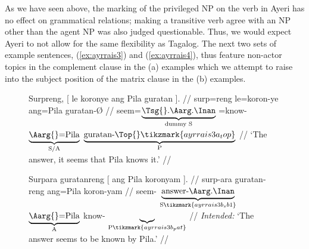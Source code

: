 As we have seen above, the marking of the privileged NP on the verb in Ayeri
has no effect on grammatical relations; making a transitive verb agree with an
NP other than the agent NP was also judged questionable. Thus, we would expect
Ayeri to not allow for the same flexibility as Tagalog. The next two sets of
example sentences, (\ref{ex:ayrrais3}) and (\ref{ex:ayrrais4}), thus feature
non-actor topics in the complement clause in the (a) examples which we attempt
to raise into the subject position of the matrix clause in the (b) examples.

\begin{figure}
\pex\label{ex:ayrrais3}
\a\label{ex:ayrrais3_1}\begingl[aboveglcskip=1.5em]
	\gla Surpreng, \textup{[} {le koronye} {ang Pila} guratan
		\textup{]}. //
	\glb surp=reng {} le=koron-ye ang=Pila guratan-Ø {} //
	\glc seem=$\underbrace{\text{\smash{\Tsg{}}.\AargI{}}}_{\text{dummy S}}$
		{}
		\PatTI{}=know-\TsgF{}%
		$\underbrace{\text{\Aarg{}=Pila}}_{\text{S/A}}$
		$\underbrace{\text{\smash{guratan}-\Top{}}%
			\tikzmark{ayrrais3a_top}%
		}_{\text{P}}$
		{} //
	\glft `The answer, it seems that Pila knows it.' //
\endgl
{}

\a\label{ex:ayrrais3_2}\ljudge*%
\begingl[aboveglftskip=1.75em]
	\gla Surpara guratanreng \textup{[} {ang Pila} koronyam {}
		\textup{]}. //
	\glb surp-ara guratan-reng {} ang=Pila koron-yam {} {} //
	\glc seem-\TsgI{}
		$\underbrace{\text{answer-\AargI{}}}_{\text{S}%
			\tikzmark{ayrrais3b_sb1}%
		}$
		{}
		$\underbrace{\text{\Aarg{}=Pila}}_{\text{A}}$
		know-\Ptcp{}
		$\underbrace{}_{\text{P}%
			\tikzmark{ayrrais3b_pat}%
		}$
		{} //
	\glft \textit{Intended:} `The answer seems to be known by Pila.' //
\endgl
{}

\xe
\end{figure}

